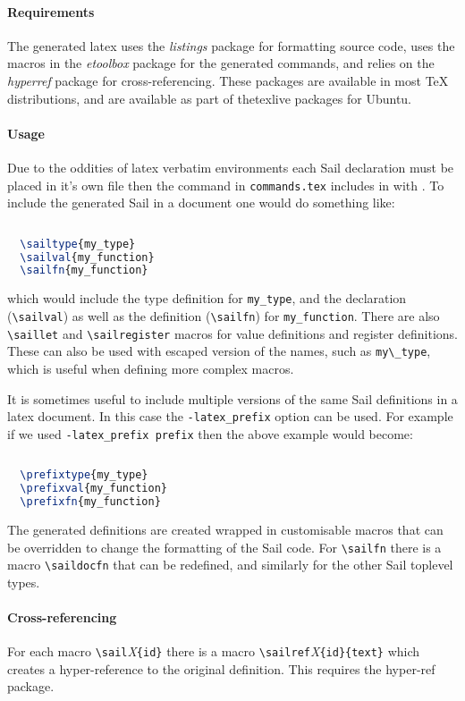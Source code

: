 \paragraph{Requirements} The generated latex uses the \emph{listings} package for formatting
source code, uses the macros in the \emph{etoolbox} package for the
generated commands, and relies on the \emph{hyperref} package for
cross-referencing. These packages are available in most TeX
distributions, and are available as part of thetexlive packages for
Ubuntu.

\paragraph{Usage} Due to the oddities of latex verbatim environments each Sail
declaration must be placed in it's own file then the command in
\verb+commands.tex+ includes in with \verb++. To
include the generated Sail in a document one would do something like:
\begin{lstlisting}[language=TeX]
  
  \sailtype{my_type}
  \sailval{my_function}
  \sailfn{my_function}
\end{lstlisting}
which would include the type definition for \verb+my_type+, and the
declaration (\verb+\sailval+) as well as the definition
(\verb+\sailfn+) for \verb+my_function+.  There are also
\verb+\saillet+ and \verb+\sailregister+ macros for value definitions
and register definitions.  These can also be used with escaped version
of the names, such as \verb+my\_type+, which is useful when defining
more complex macros.

It is sometimes useful to include multiple versions of the same Sail
definitions in a latex document. In this case the \verb+-latex_prefix+
option can be used. For example if we used \verb+-latex_prefix prefix+
then the above example would become:
\begin{lstlisting}[language=TeX]
  
  \prefixtype{my_type}
  \prefixval{my_function}
  \prefixfn{my_function}
\end{lstlisting}

The generated definitions are created wrapped in customisable macros
that can be overridden to change the formatting of the Sail code. For
\verb+\sailfn+ there is a macro \verb+\saildocfn+ that can be redefined,
and similarly for the other Sail toplevel types.

\paragraph{Cross-referencing} For each macro \verb+\sail+\emph{X}\verb+{id}+ there is a macro
\verb+\sailref+\emph{X}\verb+{id}{text}+ which creates a
hyper-reference to the original definition. This requires the
hyper-ref package.

